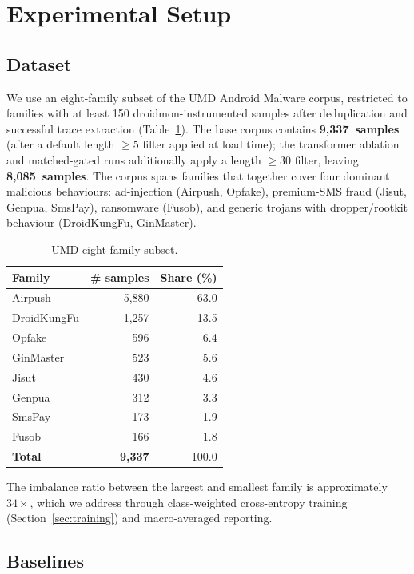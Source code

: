 \section{Experimental Setup}
\label{sec:experiments}

\subsection{Dataset}

We use an eight-family subset of the UMD Android Malware corpus,
restricted to families with at least 150 droidmon-instrumented
samples after deduplication and successful trace extraction
(Table~\ref{tab:dataset}). The base corpus contains
\textbf{9{,}337~samples} (after a default length $\geq 5$ filter
applied at load time); the transformer ablation and matched-gated
runs additionally apply a length $\geq 30$ filter, leaving
\textbf{8{,}085~samples}. The corpus spans families that together
cover four dominant malicious
behaviours: ad-injection (Airpush, Opfake), premium-SMS fraud
(Jisut, Genpua, SmsPay), ransomware (Fusob), and generic
trojans with dropper/rootkit behaviour (DroidKungFu, GinMaster).

\begin{table}[t]
\centering
\caption{UMD eight-family subset.}
\label{tab:dataset}
\begin{tabular}{lrr}
\toprule
Family & \# samples & Share (\%) \\
\midrule
Airpush      & 5{,}880 & 63.0 \\
DroidKungFu  & 1{,}257 & 13.5 \\
Opfake       &   596 & 6.4  \\
GinMaster    &   523 & 5.6  \\
Jisut        &   430 & 4.6  \\
Genpua       &   312 & 3.3  \\
SmsPay       &   173 & 1.9  \\
Fusob        &   166 & 1.8  \\
\midrule
\textbf{Total} & \textbf{9{,}337} & 100.0 \\
\bottomrule
\end{tabular}
\end{table}

The imbalance ratio between the largest and smallest family is
approximately $34\times$, which we address through class-weighted
cross-entropy training (Section~\ref{sec:training}) and
macro-averaged reporting.

\subsection{Baselines}

